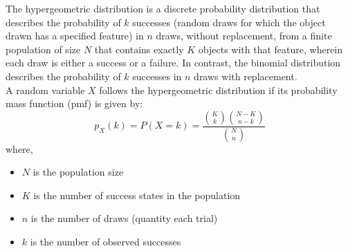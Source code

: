 \begin{note}
\end{note}
The hypergeometric distribution is a discrete probability distribution that describes the probability of $k$ successes (random draws for which the object drawn has a specified feature) in $n$ draws, without replacement, from a finite population of size $N$ that contains exactly $K$ objects with that feature, wherein each draw is either a success or a failure. In contrast, the binomial distribution describes the probability of $k$ successes in $n$ draws with replacement. \\
A random variable $X$ follows the hypergeometric distribution if its probability mass function (pmf) is given by:
$$
p_X(k) = P(X = k) = \dfrac{\binom{K}{k}\binom{N - K}{n - k}}{\binom{N}{n}}
$$
where,
\begin{itemize}
    \item $N$ is the population size 
    \item $K$ is the number of success states in the population
    \item $n$ is the number of draws (quantity each trial)
    \item $k$ is the number of observed successes
\end{itemize}

